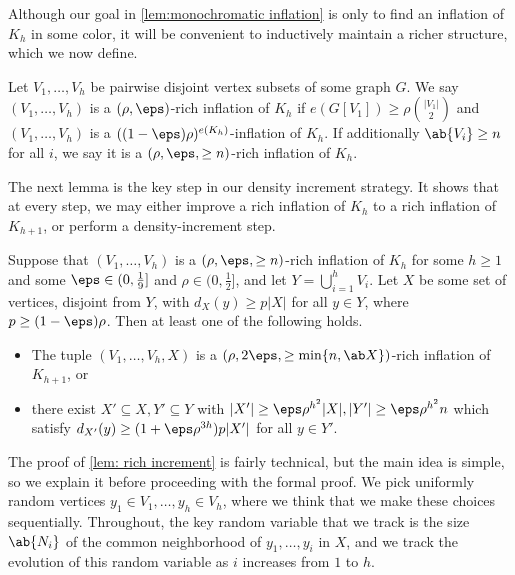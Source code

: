 Although our goal in \cref{lem:monochromatic inflation} is only to find an inflation of $K_h$ in some color, it will be convenient to inductively maintain a richer structure, which we now define.
\begin{definition}
    Let $V_1,\dots,V_h$ be pairwise disjoint vertex subsets of some graph $G$.
    We say $(V_1,\dots,V_h)$ is a $(\rho,\eps)$-rich inflation of $K_h$ if $e(G[V_1])\ge \rho \binom{|V_1|}{2}$ and $(V_1,\dots,V_h)$ is a $((1-\eps)\rho)^{e(K_h)}$-inflation of $K_h$. If additionally $\ab{V_i}\geq n$ for all $i$, we say it is a $(\rho,\eps,\geq n)$-rich inflation of $K_h$.
\end{definition}
The next lemma is the key step in our density increment strategy. It shows that at every step, we may either improve a rich inflation of $K_h$ to a rich inflation of $K_{h+1}$, or perform a density-increment step.




\begin{lemma}\label{lem: rich increment}
    Suppose that $(V_1,\dots,V_h)$ is a $(\rho,\eps,\geq n)$-rich inflation of $K_h$ for some $h \geq 1$ and some $\eps \in (0,\frac 19]$ and $\rho \in (0,\frac 12]$, and let $Y = \bigcup_{i=1}^h V_i$. Let $X$ be some set of vertices, disjoint from $Y$, with  $d_X(y)\ge p|X|$ for all $y\in Y$, where $p \geq (1-\eps)\rho$. Then at least one of the following holds.
    \begin{itemize}
        \item The tuple $(V_1,\dots,V_h,X)$ is a $(\rho,2\eps,\geq \min\{n,\ab X\})$-rich inflation of $K_{h+1}$, or
        \item there exist $X' \subseteq X, Y' \subseteq Y$ with $|X'|\ge \eps \rho^{h^2}|X|,|Y'|\ge \eps \rho^{h^2} n$ which satisfy $d_{X'}(y)\ge (1+\eps \rho^{3h})p|X'|$ for all $y\in Y'$.
    \end{itemize}
\end{lemma}
The proof of \cref{lem: rich increment} is fairly technical, but the main idea is simple, so we explain it before proceeding with the formal proof. We pick uniformly random vertices $y_1 \in V_1,\dots,y_h \in V_h$, where we think that we make these choices sequentially. Throughout, the key random variable that we track is the size $\ab{N_i}$ of the common neighborhood of $y_1,\dots,y_i$ in $X$, and we track the evolution of this random variable as $i$ increases from $1$ to $h$. 

